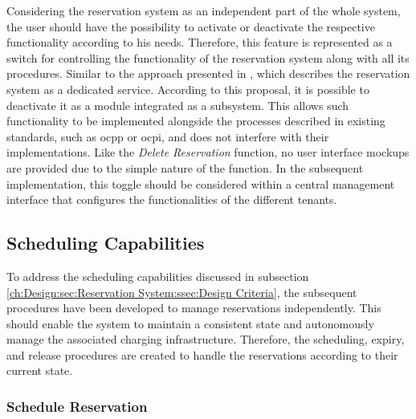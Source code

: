 Considering the reservation system as an independent part of the whole system, the user should have the possibility to activate or deactivate the respective functionality according to his needs.
Therefore, this feature is represented as a switch for controlling the functionality of the reservation system along with all its procedures. Similar to the approach presented in \cite{orcioni_ev_2020}, which describes the reservation system as a dedicated service. According to this proposal, it is possible to deactivate it as a module integrated as a subsystem.
This allows such functionality to be implemented alongside the processes described in existing standards, such as \acrshort{ocpp} or \acrshort{ocpi}, and does not interfere with their implementations.
Like the \textit{Delete Reservation} function, no user interface mockups are provided due to the simple nature of the function. In the subsequent implementation, this toggle should be considered within a central management interface that configures the functionalities of the different tenants. 

\newpage

\subsection{Scheduling Capabilities}
\label{ch:Design:sec:Reservation System:ssec:Scheduling Capabilities}

To address the scheduling capabilities discussed in subsection \ref{ch:Design:sec:Reservation System:ssec:Design Criteria}, the subsequent procedures have been developed to manage reservations independently.
This should enable the system to maintain a consistent state and autonomously manage the associated charging infrastructure.
Therefore, the scheduling, expiry, and release procedures are created to handle the reservations according to their current state.

\subsubsection{Schedule Reservation}
\label{ch:Design:sec:Reservation System:ssec:Scheduling Capabilities:sssec:Schedule Reservation}

